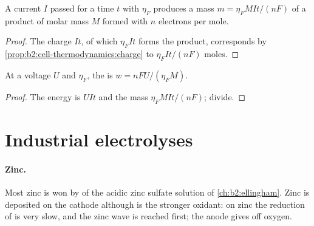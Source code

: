 \begin{proposition}\label{prop:b2:batteries-electrolysis:faraday-mass}
A current $I$ passed for a time $t$ with  $\eta_F$ produces a
mass $m = \eta_F MIt/(nF)$ of a product of molar mass $M$ formed with $n$
electrons per mole.
\end{proposition}

\begin{proof}
The charge $It$, of which $\eta_F It$ forms the product, corresponds by
\cref{prop:b2:cell-thermodynamics:charge} to $\eta_F It/(nF)$ moles.
\end{proof}

\begin{proposition}\label{prop:b2:batteries-electrolysis:energy}
At a voltage $U$ and  $\eta_F$, the  is $w = nFU/(\eta_F M)$.
\end{proposition}

\begin{proof}
The energy is $UIt$ and the mass $\eta_F MIt/(nF)$; divide.
\end{proof}

\section{Industrial electrolyses}

\paragraph{Zinc.} Most zinc is won by  of the acidic zinc sulfate
solution of \cref{ch:b2:ellingham}. Zinc is deposited on the cathode although
 is the stronger oxidant: on zinc the reduction of  is very slow,
and the zinc wave is reached first; the anode gives off oxygen.

